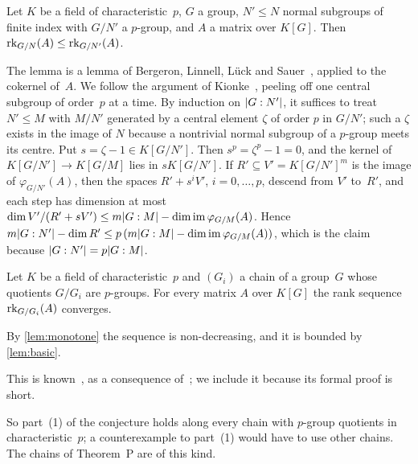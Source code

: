 \begin{lemma}[Monotonicity]\label{lem:monotone}
Let $K$ be a field of characteristic~$p$, $G$ a group, $N'\le N$ normal subgroups of finite index with $G/N'$ a $p$-group,
and $A$ a matrix over $K[G]$. Then $\operatorname{rk}_{G/N}(A)\le\operatorname{rk}_{G/N'}(A)$.
\end{lemma}
\begin{outline}
The lemma is a lemma of Bergeron, Linnell, L\"uck and Sauer~\cite[Lemma~4.1]{BLLS2014}, applied to the cokernel of~$A$.
We follow the argument of Kionke~\cite[Lemma~2.6 and Theorem~2.5]{Kionke2017}, peeling off one central subgroup of
order~$p$ at a time. By induction
on $\lvert G:N' \rvert$, it suffices to treat $N'\le M$ with $M/N'$ generated by a central element $\zeta$ of order $p$ in
$G/N'$; such a $\zeta$ exists in the image of $N$ because a nontrivial normal subgroup of a $p$-group meets its centre.
Put $s=\zeta-1\in K[G/N']$. Then $s^p=\zeta^p-1=0$, and the kernel of $K[G/N']\to K[G/M]$ lies in $sK[G/N']$. If
$R'\subseteq V'=K[G/N']^m$ is the image of $\varphi_{G/N'}(A)$, then the spaces $R'+s^iV'$, $i=0,\dots,p$, descend from
$V'$ to~$R'$, and each step has dimension at most $\dim V'/(R'+sV')\le m\lvert G:M \rvert-\dim\operatorname{im}\varphi_{G/M}(A)$. Hence
$m\lvert G:N' \rvert-\dim R'\le p\,(m\lvert G:M \rvert-\dim\operatorname{im}\varphi_{G/M}(A))$, which is the claim because
$\lvert G:N' \rvert=p\lvert G:M \rvert$.
\end{outline}

\begin{theorem}\label{thm:convergence}
Let $K$ be a field of characteristic~$p$ and $(G_i)$ a chain of a group~$G$ whose quotients $G/G_i$ are $p$-groups. For
every matrix $A$ over $K[G]$ the rank sequence $\operatorname{rk}_{G/G_i}(A)$ converges.
\end{theorem}
\begin{outline}
By \cref{lem:monotone} the sequence is non-decreasing, and it is bounded by \cref{lem:basic}.
\end{outline}

This is known~\cite[Proposition~11.2]{JaikinSurvey2019}, as a consequence of~\cite[Lemma~4.1]{BLLS2014}; we include it
because its formal proof is short.

So part~(1) of the conjecture holds along every chain with $p$-group quotients in characteristic~$p$; a counterexample
to part~(1) would have to use other chains. The chains of Theorem~P are of this kind.

